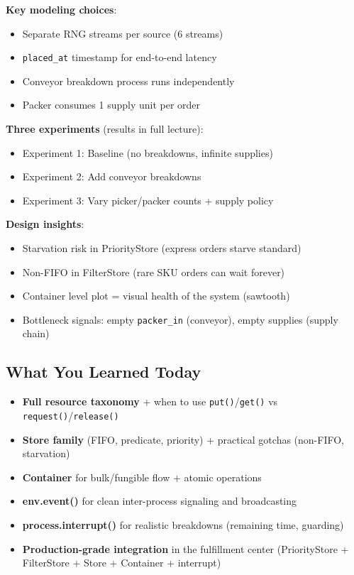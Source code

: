 \documentclass[11pt]{article}
\begin{document}
\textbf{Key modeling choices}:
\begin{itemize}[leftmargin=*]
\item Separate RNG streams per source (6 streams)
\item \texttt{placed\_at} timestamp for end-to-end latency
\item Conveyor breakdown process runs independently
\item Packer consumes 1 supply unit per order
\end{itemize}

\textbf{Three experiments} (results in full lecture):
\begin{itemize}[leftmargin=*]
\item Experiment 1: Baseline (no breakdowns, infinite supplies)
\item Experiment 2: Add conveyor breakdowns
\item Experiment 3: Vary picker/packer counts + supply policy
\end{itemize}

\textbf{Design insights}:
\begin{itemize}[leftmargin=*]
\item Starvation risk in PriorityStore (express orders starve standard)
\item Non-FIFO in FilterStore (rare SKU orders can wait forever)
\item Container level plot = visual health of the system (sawtooth)
\item Bottleneck signals: empty \texttt{packer\_in} (conveyor), empty supplies (supply chain)
\end{itemize}

\subsection*{What You Learned Today}
\begin{itemize}[leftmargin=*]
\item \textbf{Full resource taxonomy} + when to use \texttt{put()}/\texttt{get()} vs \texttt{request()}/\texttt{release()}
\item \textbf{Store family} (FIFO, predicate, priority) + practical gotchas (non-FIFO, starvation)
\item \textbf{Container} for bulk/fungible flow + atomic operations
\item \textbf{env.event()} for clean inter-process signaling and broadcasting
\item \textbf{process.interrupt()} for realistic breakdowns (remaining time, guarding)
\item \textbf{Production-grade integration} in the fulfillment center (PriorityStore + FilterStore + Store + Container + interrupt)
\end{itemize}
\end{document}
